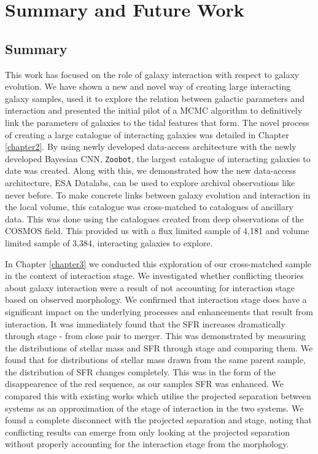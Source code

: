 \chapter{Summary and Future Work}\label{chapter:conclusion}
\section{Summary}
\noindent This work has focused on the role of galaxy interaction with respect to galaxy evolution. We have shown a new and novel way of creating large interacting galaxy samples, used it to explore the relation between galactic parameters and interaction and presented the initial pilot of a MCMC algorithm to definitively link the parameters of galaxies to the tidal features that form. The novel process of creating a large catalogue of interacting galaxies was detailed in Chapter \ref{chapter2}. By using newly developed data-access architecture with the newly developed Bayesian CNN, \texttt{Zoobot}, the largest catalogue of interacting galaxies to date was created. Along with this, we demonstrated how the new data-access architecture, ESA Datalabs, can be used to explore archival observations like never before. To make concrete links between galaxy evolution and interaction in the local volume, this catalogue was cross-matched to catalogues of ancillary data. This was done using the catalogues created from deep observations of the COSMOS field. This provided us with a flux limited sample of 4,181 and volume limited sample of 3,384, interacting galaxies to explore.

In Chapter \ref{chapter3} we conducted this exploration of our cross-matched sample in the context of interaction stage. We investigated whether conflicting theories about galaxy interaction were a result of not accounting for interaction stage based on observed morphology. We confirmed that interaction stage does have a significant impact on the underlying processes and enhancements that result from interaction. It was immediately found that the SFR increases dramatically through stage - from close pair to merger. This was demonstrated by measuring the distributions of stellar mass and SFR through stage and comparing them. We found that for distributions of stellar mass drawn from the same parent sample, the distribution of SFR changes completely. This was in the form of the disappearence of the red sequence, as our samples SFR was enhanced. We compared this with existing works which utilise the projected separation between systems as an approximation of the stage of interaction in the two systems. We found a complete disconnect with the projected separation and stage, noting that conflicting results can emerge from only looking at the projected separation without properly accounting for the interaction stage from the morphology. 

